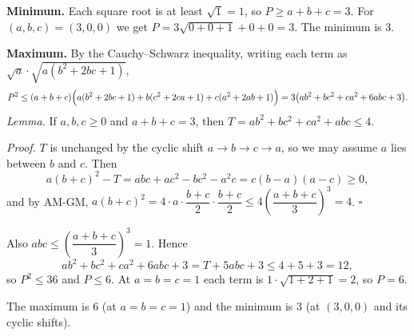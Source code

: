 \textbf{Minimum.} Each square root is at least $\sqrt1=1$, so $P\ge a+b+c=3$. For $(a,b,c)=(3,0,0)$ we get $P=3\sqrt{0+0+1}+0+0=3$. The minimum is $3$.

\textbf{Maximum.} By the Cauchy--Schwarz inequality, writing each term as $\sqrt a\cdot\sqrt{a(b^2+2bc+1)}$,
\[
P^2\le(a+b+c)\Bigl(a(b^2+2bc+1)+b(c^2+2ca+1)+c(a^2+2ab+1)\Bigr)=3\bigl(ab^2+bc^2+ca^2+6abc+3\bigr).
\]
\emph{Lemma.} If $a,b,c\ge0$ and $a+b+c=3$, then $T=ab^2+bc^2+ca^2+abc\le4$.

\emph{Proof.} $T$ is unchanged by the cyclic shift $a\to b\to c\to a$, so we may assume $a$ lies between $b$ and $c$. Then
\[
a(b+c)^2-T=abc+ac^2-bc^2-a^2c=c(b-a)(a-c)\ge0,
\]
and by AM-GM, $a(b+c)^2=4\cdot a\cdot\dfrac{b+c}{2}\cdot\dfrac{b+c}{2}\le4\left(\dfrac{a+b+c}{3}\right)^3=4$. $\square$

Also $abc\le\left(\dfrac{a+b+c}{3}\right)^3=1$. Hence
\[
ab^2+bc^2+ca^2+6abc+3=T+5abc+3\le4+5+3=12,
\]
so $P^2\le36$ and $P\le6$. At $a=b=c=1$ each term is $1\cdot\sqrt{1+2+1}=2$, so $P=6$.

The maximum is $\boxed{6}$ (at $a=b=c=1$) and the minimum is $\boxed{3}$ (at $(3,0,0)$ and its cyclic shifts).

